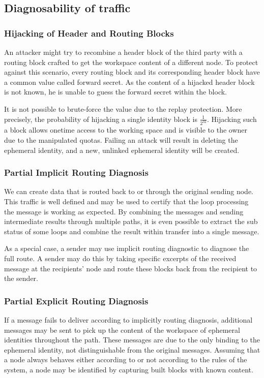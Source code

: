 \subsection{Diagnosability of traffic}

\subsubsection{Hijacking of Header and Routing Blocks}
An attacker might try to recombine a header block of the third party with a routing block crafted to get the workspace content of a different node. To protect against this scenario, every routing block and its corresponding header block have a common value called forward secret. As the content of a hijacked header block is not known, he is unable to guess the forward secret within the block.

It is not possible to brute-force the value due to the replay protection. More precisely, the probability of hijacking a single identity block is $\frac{1}{2^{32}}$. Hijacking such a block allows onetime access to the working space and is visible to the owner due to the manipulated quotas. Failing an attack will result in deleting the ephemeral identity, and a new, unlinked ephemeral identity will be created. 

\subsubsection{Partial Implicit Routing Diagnosis}
We can create data that is routed back to or through the original sending node. This traffic is well defined and may be used to certify that the loop processing the message is working as expected. By combining the messages and sending intermediate results through multiple paths, it is even possible to extract the sub status of some loops and combine the result within transfer into a single message.

As a special case, a sender may use implicit routing diagnostic to diagnose the full route. A sender may do this by taking specific excerpts of the received message at the recipients' node and route these blocks back from the recipient to the sender. 

\subsubsection{Partial Explicit Routing Diagnosis}
If a message fails to deliver according to implicitly routing diagnosis, additional messages may be sent to pick up the content of the workspace of ephemeral identities throughout the path. These messages are due to the only binding to the ephemeral identity, not distinguishable from the original messages. Assuming that a node always behaves either according to or not according to the rules of the system, a node may be identified by capturing built blocks with known content.

